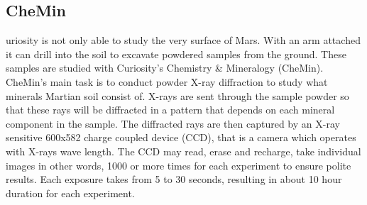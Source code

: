 \subsection*{CheMin}
uriosity is not only able to study the very surface of Mars.
With an arm attached it can drill into the soil to excavate powdered samples from the ground.
These samples are studied with Curiosity's Chemistry \& Mineralogy (CheMin).
CheMin's main task is to conduct powder X-ray diffraction to study what minerals Martian soil consist of.
X-rays are sent through the sample powder so that these rays will be diffracted in a pattern that depends on each mineral component in the sample.
The diffracted rays are then captured by an X-ray sensitive 600x582 charge coupled device (CCD), that is a camera which operates with X-rays wave length.
The CCD may read, erase and recharge, take individual images in other words, 1000 or more times for each experiment to ensure polite results.
Each exposure takes from 5 to 30 seconds, resulting in about 10 hour duration for each experiment. \cite{CheMin}